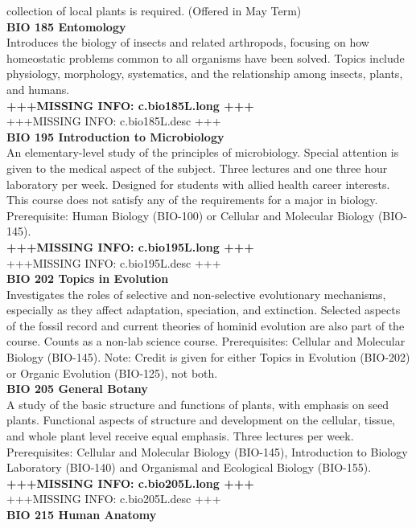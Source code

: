 \documentclass[
  letterpaper,
]{scrbook}
\begin{document}
collection of local plants is required. (Offered in May Term)\\
\textbf{BIO 185 Entomology}\\
Introduces the biology of insects and related arthropods, focusing on
how homeostatic problems common to all organisms have been solved.
Topics include physiology, morphology, systematics, and the relationship
among insects, plants, and humans.\\
\textbf{+++MISSING INFO: c.bio185L.long +++}\\
+++MISSING INFO: c.bio185L.desc +++\\
\textbf{BIO 195 Introduction to Microbiology}\\
An elementary-level study of the principles of microbiology. Special
attention is given to the medical aspect of the subject. Three lectures
and one three hour laboratory per week. Designed for students with
allied health career interests. This course does not satisfy any of the
requirements for a major in biology. Prerequisite: Human Biology
(BIO-100) or Cellular and Molecular Biology (BIO-145).\\
\textbf{+++MISSING INFO: c.bio195L.long +++}\\
+++MISSING INFO: c.bio195L.desc +++\\
\textbf{BIO 202 Topics in Evolution}\\
Investigates the roles of selective and non-selective evolutionary
mechanisms, especially as they affect adaptation, speciation, and
extinction. Selected aspects of the fossil record and current theories
of hominid evolution are also part of the course. Counts as a non-lab
science course. Prerequisites: Cellular and Molecular Biology (BIO-145).
Note: Credit is given for either Topics in Evolution (BIO-202) or
Organic Evolution (BIO-125), not both.\\
\textbf{BIO 205 General Botany}\\
A study of the basic structure and functions of plants, with emphasis on
seed plants. Functional aspects of structure and development on the
cellular, tissue, and whole plant level receive equal emphasis. Three
lectures per week. Prerequisites: Cellular and Molecular Biology
(BIO-145), Introduction to Biology Laboratory (BIO-140) and Organismal
and Ecological Biology (BIO-155).\\
\textbf{+++MISSING INFO: c.bio205L.long +++}\\
+++MISSING INFO: c.bio205L.desc +++\\
\textbf{BIO 215 Human Anatomy}\\
\end{document}

